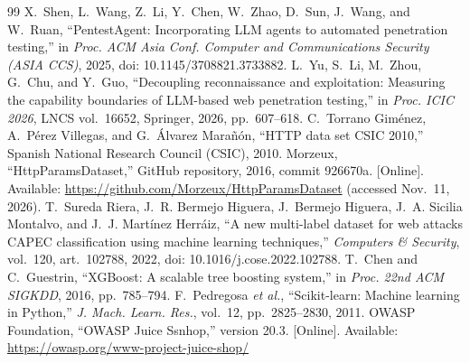 \documentclass[conference]{IEEEtran}
\begin{document}
\begin{thebibliography}{99}
 X.~Shen, L.~Wang, Z.~Li, Y.~Chen, W.~Zhao, D.~Sun, J.~Wang, and W.~Ruan, ``PentestAgent: Incorporating LLM agents to automated penetration testing,'' in \emph{Proc. ACM Asia Conf. Computer and Communications Security (ASIA CCS)}, 2025, doi: 10.1145/3708821.3733882.
 L.~Yu, S.~Li, M.~Zhou, G.~Chu, and Y.~Guo, ``Decoupling reconnaissance and exploitation: Measuring the capability boundaries of LLM-based web penetration testing,'' in \emph{Proc. ICIC 2026}, LNCS vol.~16652, Springer, 2026, pp.~607--618.
 C.~Torrano Gim\'enez, A.~P\'erez Villegas, and G.~\'Alvarez Mara\~n\'on, ``HTTP data set CSIC 2010,'' Spanish National Research Council (CSIC), 2010.
 Morzeux, ``HttpParamsDataset,'' GitHub repository, 2016, commit 926670a. [Online]. Available: \url{https://github.com/Morzeux/HttpParamsDataset} (accessed Nov.~11, 2026).
 T.~Sureda Riera, J.~R. Bermejo Higuera, J.~Bermejo Higuera, J.~A. Sicilia Montalvo, and J.~J. Mart\'inez Herr\'aiz, ``A new multi-label dataset for web attacks CAPEC classification using machine learning techniques,'' \emph{Computers \& Security}, vol.~120, art.~102788, 2022, doi: 10.1016/j.cose.2022.102788.
 T.~Chen and C.~Guestrin, ``XGBoost: A scalable tree boosting system,'' in \emph{Proc. 22nd ACM SIGKDD}, 2016, pp.~785--794.
 F.~Pedregosa \emph{et al.}, ``Scikit-learn: Machine learning in Python,'' \emph{J. Mach. Learn. Res.}, vol.~12, pp.~2825--2830, 2011.
 OWASP Foundation, ``OWASP Juice Ssnhop,'' version 20.3. [Online]. Available: \url{https://owasp.org/www-project-juice-shop/}
\end{thebibliography}
\end{document}
